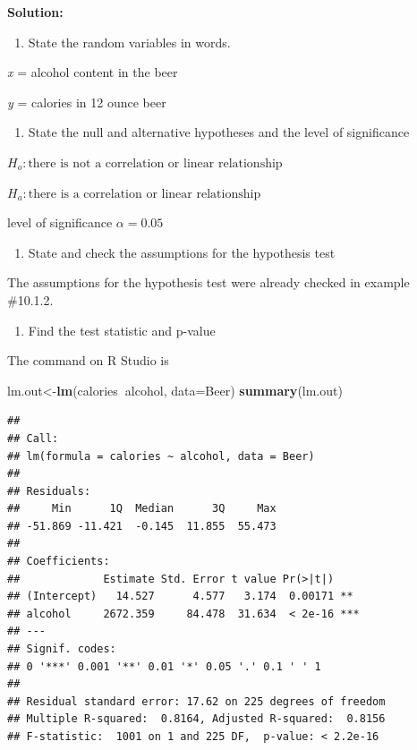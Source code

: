 \documentclass[
]{book}
\newenvironment{Shaded}{\begin{snugshade}}{\end{snugshade}}
\newcommand{\DataTypeTok}[1]{\textcolor[rgb]{0.13,0.29,0.53}{#1}}
\newcommand{\KeywordTok}[1]{\textcolor[rgb]{0.13,0.29,0.53}{\textbf{#1}}}
\newcommand{\NormalTok}[1]{#1}
\newcommand{\OperatorTok}[1]{\textcolor[rgb]{0.81,0.36,0.00}{\textbf{#1}}}
\providecommand{\tightlist}{%
  \setlength{\itemsep}{0pt}\setlength{\parskip}{0pt}}
\begin{document}
\textbf{Solution:}

\begin{enumerate}
\def\labelenumi{\arabic{enumi}.}
\tightlist
\item
  State the random variables in words.
\end{enumerate}

\emph{x} = alcohol content in the beer

\emph{y} = calories in 12 ounce beer

\begin{enumerate}
\def\labelenumi{\arabic{enumi}.}
\setcounter{enumi}{1}
\tightlist
\item
  State the null and alternative hypotheses and the level of significance
\end{enumerate}

\(H_o: \text{there is not a correlation or linear relationship}\)

\(H_a: \text{there is a correlation or linear relationship}\)

level of significance \(\alpha=0.05\)

\begin{enumerate}
\def\labelenumi{\arabic{enumi}.}
\setcounter{enumi}{2}
\tightlist
\item
  State and check the assumptions for the hypothesis test
\end{enumerate}

The assumptions for the hypothesis test were already checked in example \#10.1.2.

\begin{enumerate}
\def\labelenumi{\arabic{enumi}.}
\setcounter{enumi}{3}
\tightlist
\item
  Find the test statistic and p-value
\end{enumerate}

The command on R Studio is

\begin{Shaded}
\begin{Highlighting}[]
\NormalTok{lm.out<-}\KeywordTok{lm}\NormalTok{(calories}\OperatorTok{~}\NormalTok{alcohol, }\DataTypeTok{data=}\NormalTok{Beer)}
\KeywordTok{summary}\NormalTok{(lm.out)}
\end{Highlighting}
\end{Shaded}

\begin{verbatim}
## 
## Call:
## lm(formula = calories ~ alcohol, data = Beer)
## 
## Residuals:
##     Min      1Q  Median      3Q     Max 
## -51.869 -11.421  -0.145  11.855  55.473 
## 
## Coefficients:
##             Estimate Std. Error t value Pr(>|t|)    
## (Intercept)   14.527      4.577   3.174  0.00171 ** 
## alcohol     2672.359     84.478  31.634  < 2e-16 ***
## ---
## Signif. codes:  
## 0 '***' 0.001 '**' 0.01 '*' 0.05 '.' 0.1 ' ' 1
## 
## Residual standard error: 17.62 on 225 degrees of freedom
## Multiple R-squared:  0.8164,	Adjusted R-squared:  0.8156 
## F-statistic:  1001 on 1 and 225 DF,  p-value: < 2.2e-16
\end{verbatim}
\end{document}
